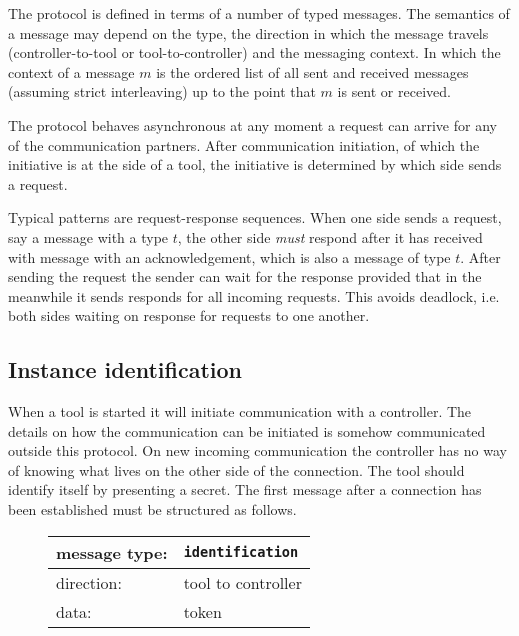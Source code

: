 \documentclass{article}
\newcommand{\msg}[1]{\texttt{#1}}
\begin{document}
  The protocol is defined in terms of a number of typed messages. The semantics
  of a message may depend on the type, the direction in which the message
  travels (controller-to-tool or tool-to-controller) and the messaging context.
  In which the context of a message $m$ is the ordered list of all sent and
  received messages (assuming strict interleaving) up to the point that $m$ is
  sent or received.

  The protocol behaves asynchronous at any moment a request can arrive for any
  of the communication partners. After communication initiation, of which the
  initiative is at the side of a tool, the initiative is determined by which
  side sends a request.

  Typical patterns are request-response sequences. When one side sends a
  request, say a message with a type $t$, the other side \emph{must} respond
  after it has received with message with an acknowledgement, which is also a
  message of type $t$. After sending the request the sender can wait for the
  response provided that in the meanwhile it sends responds for all incoming
  requests. This avoids deadlock, i.e. both sides waiting on response for
  requests to one another.

  \subsection{Instance identification}

   When a tool is started it will initiate communication with a controller.
   The details on how the communication can be initiated is somehow
   communicated outside this protocol. On new incoming communication the
   controller has no way of knowing what lives on the other side of the
   connection. The tool should identify itself by presenting a secret. The
   first message after a connection has been established must be structured as
   follows.
   
   \begin{figure}[H]
    \begin{center}
     \begin{tabular}{|ll|}
      \hline
      message type:    & \msg{identification} \\
      \hline
      direction:       & tool to controller \\
      data:            & token \\
      \hline
     \end{tabular}
    \end{center}
   \end{figure}
\end{document}
